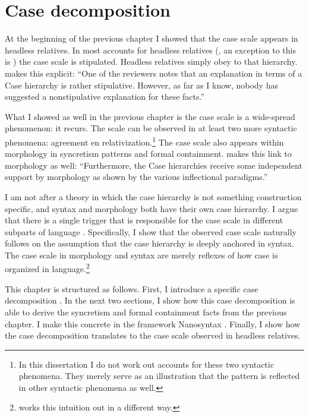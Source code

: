 
\chapter{Case decomposition}

At the beginning of the previous chapter I showed that the case scale  appears in headless relatives. In most accounts for headless relatives (\citealt[cf.][]{pittner1995,vogel2001,grosu2003,harbert1978}, an exception to this is \citealt{himmelreich2017}) the case scale is stipulated. Headless relatives simply obey to that hierarchy.  makes this explicit: ``One of the reviewers notes that an explanation in terms of a Case hierarchy is rather stipulative. However, as far as I know, nobody has suggested a nonstipulative explanation for these facts.''

What I showed as well in the previous chapter is the case scale  is a wide-spread phenomenon: it recurs. The scale can be observed in at least two more syntactic phenomena: agreement en relativization.\footnote{
In this dissertation I do not work out accounts for these two syntactic phenomena. They merely serve as an illustration that the pattern is reflected in other syntactic phenomena as well.}
The case scale also appears within morphology in syncretism patterns and formal containment.  makes this link to morphology as well: ``Furthermore, the Case hierarchies receive some independent support by morphology as shown by the various inflectional paradigms.''

I am not after a theory in which the case hierarchy is not something construction specific, and syntax and morphology both have their own case hierarchy. I argue that there is a single trigger that is responsible for the case scale in different subparts of language \citep[cf.][on numeral constructions]{caha2019}. Specifically, I show that the observed case scale naturally follows on the assumption that the case hierarchy is deeply anchored in syntax. The case scale in morphology and syntax are merely reflexes of how case is organized in language.\footnote{
\citet{himmelreich2017} works this intuition out in a different way.
}

This chapter is structured as follows. First, I introduce a specific case decomposition \citep{caha2009}. In the next two sections, I show how this case decomposition is able to derive the syncretism and formal containment facts from the previous chapter. I make this concrete in the framework Nanosyntax \citep{starke2009}. Finally, I show how the case decomposition translates to the case scale observed in headless relatives.


